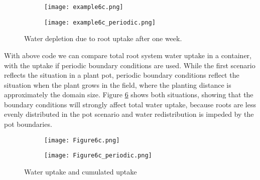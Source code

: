 \begin{figure}
\begin{subfigure}[c]{0.5\textwidth}
\texttt{[image: example6c.png]}
 \label{fig:example6c}
\end{subfigure}
\begin{subfigure}[c]{0.5\textwidth}
\texttt{[image: example6c\_periodic.png]}
 \label{fig:example6c_peridodic}
\end{subfigure}
\caption{Water depletion due to root uptake after one week. } \label{fig:example6c}
\end{figure}

With above code we can compare total root system water uptake in a container, with the uptake if periodic boundary conditions are used. While the first scenario reflects the situation in a plant pot, periodic boundary conditions reflect the situation when the plant grows in the field, where the planting distance is approximately the domain size. Figure \ref{fig:uptake} shows both situations, showing that the boundary conditions will strongly affect total water uptake, because roots are less evenly distributed in the pot scenario and water redistribution is impeded by the pot boundaries.

\begin{figure}
\begin{subfigure}[c]{1\textwidth} 
\texttt{[image: Figure6c.png]}
 \label{fig:uptake_confined}
\end{subfigure}
\begin{subfigure}[c]{1\textwidth}
\texttt{[image: Figure6c\_periodic.png]}
 \label{fig:uptake_peridodic}
\end{subfigure}
\caption{Water uptake and cumulated uptake} \label{fig:uptake}
\end{figure}



